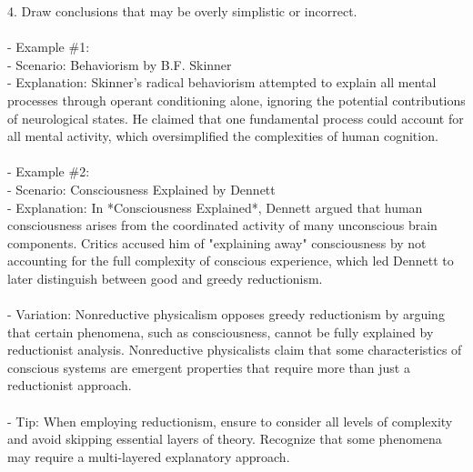 \documentclass[a4paper,12pt,single,pdftex]{scrartcl}
\begin{document}
    
        4. Draw conclusions that may be overly simplistic or incorrect.
    \\

    
      
    \\

    
      - Example \#1:
    \\

    
        - Scenario: Behaviorism by B.F. Skinner
    \\

    
        - Explanation: Skinner's radical behaviorism attempted to explain all mental processes through operant conditioning alone, ignoring the potential contributions of neurological states. He claimed that one fundamental process could account for all mental activity, which oversimplified the complexities of human cognition.
    \\

    
      
    \\

    
      - Example \#2:
    \\

    
        - Scenario: Consciousness Explained by Dennett
    \\

    
        - Explanation: In *Consciousness Explained*, Dennett argued that human consciousness arises from the coordinated activity of many unconscious brain components. Critics accused him of "explaining away" consciousness by not accounting for the full complexity of conscious experience, which led Dennett to later distinguish between good and greedy reductionism.
    \\

    
      
    \\

    
      - Variation: Nonreductive physicalism opposes greedy reductionism by arguing that certain phenomena, such as consciousness, cannot be fully explained by reductionist analysis. Nonreductive physicalists claim that some characteristics of conscious systems are emergent properties that require more than just a reductionist approach.
    \\

    
      
    \\

    
      - Tip: When employing reductionism, ensure to consider all levels of complexity and avoid skipping essential layers of theory. Recognize that some phenomena may require a multi-layered explanatory approach.
    \\
\end{document}
